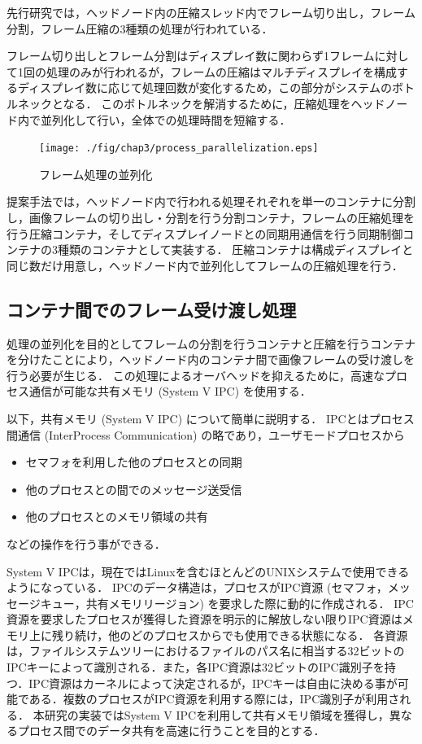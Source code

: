 先行研究では，ヘッドノード内の圧縮スレッド内でフレーム切り出し，フレーム分割，フレーム圧縮の3種類の処理が行われている．

フレーム切り出しとフレーム分割はディスプレイ数に関わらず1フレームに対して1回の処理のみが行われるが，フレームの圧縮はマルチディスプレイを構成するディスプレイ数に応じて処理回数が変化するため，この部分がシステムのボトルネックとなる．
このボトルネックを解消するために，圧縮処理をヘッドノード内で並列化して行い，全体での処理時間を短縮する．

\begin{figure}[H]
    \hspace*{\fill}
    \texttt{[image: ./fig/chap3/process\_parallelization.eps]}
    \hspace*{\fill}
    \caption{フレーム処理の並列化}
\end{figure}


提案手法では，ヘッドノード内で行われる処理それぞれを単一のコンテナに分割し，画像フレームの切り出し・分割を行う分割コンテナ，フレームの圧縮処理を行う圧縮コンテナ，そしてディスプレイノードとの同期用通信を行う同期制御コンテナの3種類のコンテナとして実装する．
圧縮コンテナは構成ディスプレイと同じ数だけ用意し，ヘッドノード内で並列化してフレームの圧縮処理を行う．

\subsection*{コンテナ間でのフレーム受け渡し処理}

処理の並列化を目的としてフレームの分割を行うコンテナと圧縮を行うコンテナを分けたことにより，ヘッドノード内のコンテナ間で画像フレームの受け渡しを行う必要が生じる．
この処理によるオーバヘッドを抑えるために，高速なプロセス通信が可能な共有メモリ (System V IPC) \cite{kerrisk2010linux,linux_kernel}を使用する．

以下，共有メモリ (System V IPC) について簡単に説明する．
IPCとはプロセス間通信 (InterProcess Communication) の略であり，ユーザモードプロセスから

\begin{itemize}
    \item セマフォを利用した他のプロセスとの同期
    \item 他のプロセスとの間でのメッセージ送受信
    \item 他のプロセスとのメモリ領域の共有
\end{itemize}

などの操作を行う事ができる．

System V IPCは，現在ではLinuxを含むほとんどのUNIXシステムで使用できるようになっている．
IPCのデータ構造は，プロセスがIPC資源 (セマフォ，メッセージキュー，共有メモリリージョン) を要求した際に動的に作成される．
IPC資源を要求したプロセスが獲得した資源を明示的に解放しない限りIPC資源はメモリ上に残り続け，他のどのプロセスからでも使用できる状態になる．
各資源は，ファイルシステムツリーにおけるファイルのパス名に相当する32ビットのIPCキーによって識別される．また，各IPC資源は32ビットのIPC識別子を持つ．IPC資源はカーネルによって決定されるが，IPCキーは自由に決める事が可能である．複数のプロセスがIPC資源を利用する際には，IPC識別子が利用される．
本研究の実装ではSystem V IPCを利用して共有メモリ領域を獲得し，異なるプロセス間でのデータ共有を高速に行うことを目的とする．

